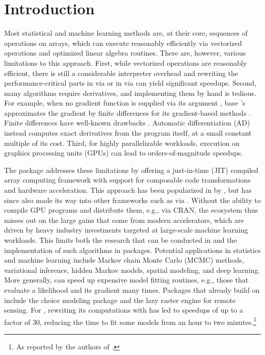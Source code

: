 \documentclass[article,shortnames]{jss}
\begin{document}
\section{Introduction}\label{intro}

Most statistical and machine learning methods are, at their core, sequences of operations on arrays, which  can execute reasonably efficiently via vectorized operations and optimized linear algebra routines.
There are, however, various limitations to this approach.
First, while vectorized operations are reasonably efficient, there is still a considerable interpreter overhead and rewriting the performance-critical parts in  via  \citep{ref-rcpp} or in  via  \citep{ref-rextendr} can yield significant speedups.
Second, many algorithms require derivatives, and implementing them by hand is tedious.
For example, when no gradient function is supplied via its argument , base 's  approximates the gradient by finite differences for its gradient-based methods \citep{ref-r}.
Finite differences have well-known drawbacks \citep[Section~8.1]{ref-nocedal2006numerical}.
Automatic differentiation (AD) instead computes exact derivatives from the program itself, at a small constant multiple of its cost.
Third, for highly parallelizable workloads, execution on graphics processing units (GPUs) can lead to orders-of-magnitude speedups.

The  package  addresses these limitations by offering a just-in-time (JIT) compiled array computing framework with support for composable code transformations and hardware acceleration.
This approach has been popularized in  by  \citep{ref-jax}, but has since also made its way into other frameworks such as  \citep{ref-pytorch} via .
Without the ability to compile GPU programs and distribute them, e.g., via CRAN, the  ecosystem thus misses out on the large gains that come from modern accelerators, which are driven by heavy industry investments targeted at large-scale machine learning workloads.
This limits both the research that can be conducted in  and the implementation of such algorithms in  packages.
Potential applications in statistics and machine learning include Markov chain Monte Carlo (MCMC) methods, variational inference, hidden Markov models, spatial modeling, and deep learning.
More generally,  can speed up expensive model fitting routines, e.g., those that evaluate a likelihood and its gradient many times.
Packages that already build on  include the choice modeling package  \citep{ref-apollo} and the lazy raster engine  \citep{ref-garry} for remote sensing.
For , rewriting its computations with  has led to speedups of up to a factor of 30, reducing the time to fit some models from an hour to two minutes.\footnote{As reported by the authors of .}
\end{document}
